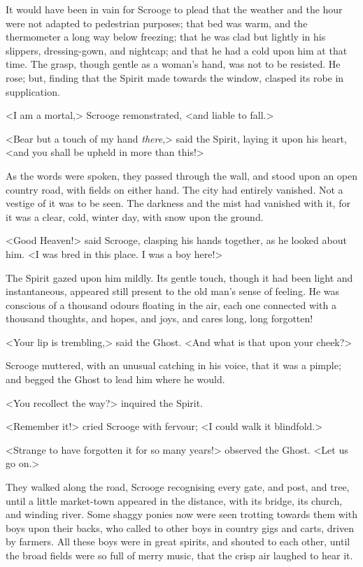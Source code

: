 It would have been in vain for Scrooge to plead that the weather and the hour
were not adapted to pedestrian purposes; that bed was warm, and the thermometer
a long way below freezing; that he was clad but lightly in his slippers,
dressing-gown, and nightcap; and that he had a cold upon him at that time. The
grasp, though gentle as a woman's hand, was not to be resisted. He rose; but,
finding that the Spirit made towards the window, clasped its robe in
supplication.

<I am a mortal,> Scrooge remonstrated, <and liable to fall.>

<Bear but a touch of my hand \emph{there},> said the Spirit, laying it upon his
heart, <and you shall be upheld in more than this!>

As the words were spoken, they passed through the wall, and stood upon an open
country road, with fields on either hand. The city had entirely vanished. Not a
vestige of it was to be seen. The darkness and the mist had vanished with it,
for it was a clear, cold, winter day, with snow upon the ground.

<Good Heaven!> said Scrooge, clasping his hands together, as he looked about
him. <I was bred in this place. I was a boy here!>

The Spirit gazed upon him mildly. Its gentle touch, though it had been light and
instantaneous, appeared still present to the old man's sense of feeling. He was
conscious of a thousand odours floating in the air, each one connected with a
thousand thoughts, and hopes, and joys, and cares long, long forgotten!

<Your lip is trembling,> said the Ghost. <And what is that upon your cheek?>

Scrooge muttered, with an unusual catching in his voice, that it was a pimple;
and begged the Ghost to lead him where he would.

<You recollect the way?> inquired the Spirit.

<Remember it!> cried Scrooge with fervour; <I could walk it blindfold.>

<Strange to have forgotten it for so many years!> observed the Ghost. <Let us go
on.>

They walked along the road, Scrooge recognising every gate, and post, and tree,
until a little market-town appeared in the distance, with its bridge, its
church, and winding river. Some shaggy ponies now were seen trotting towards
them with boys upon their backs, who called to other boys in country gigs and
carts, driven by farmers. All these boys were in great spirits, and shouted to
each other, until the broad fields were so full of merry music, that the crisp
air laughed to hear it.

